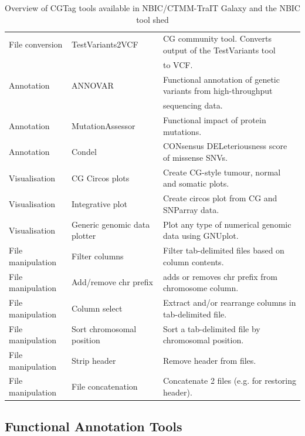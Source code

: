 \begin{table}[t!]
\begin{tabular}{l|l|l}
File conversion   & TestVariants2VCF      & CG community tool. Converts output of the TestVariants tool \\
                  &                       & to VCF.\\
Annotation        & ANNOVAR               & Functional annotation of genetic variants from high-throughput \\
                  &                       & sequencing data.\\
Annotation        & MutationAssessor      & Functional impact of protein mutations.\\
Annotation        & Condel                & CONsensus DELeteriousness score of missense SNVs.\\
Visualisation     & CG Circos plots       & Create CG-style tumour, normal and somatic plots.\\
Visualisation     & Integrative plot      & Create circos plot from CG and SNParray data.\\
Visualisation     & Generic genomic data plotter & Plot any type of numerical genomic data using GNUplot.\\
File manipulation & Filter columns        & Filter tab-delimited files based on column contents.\\
File manipulation & Add/remove chr prefix & adds or removes chr prefix from chromosome column.\\
File manipulation & Column select         & Extract and/or rearrange columns in tab-delimited file.\\
File manipulation & Sort chromosomal position & Sort a tab-delimited file by chromosomal position.\\
File manipulation & Strip header          & Remove header from files.\\
File manipulation & File concatenation    & Concatenate 2 files (e.g. for restoring header).\\

\end{tabular}
\caption{Overview of CGTag tools available in NBIC/CTMM-TraIT Galaxy and the NBIC tool shed}
\label{table:tools}
\end{table}
\normalsize


\subsection*{Functional Annotation Tools}

